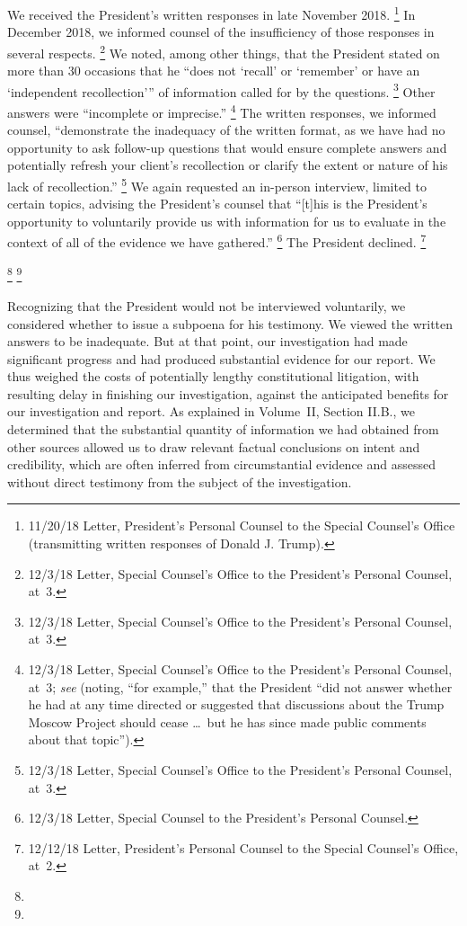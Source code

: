 We received the President's written responses in late November 2018.%
\footnote{11/20/18 Letter, President's Personal Counsel to the Special Counsel's Office (transmitting written responses of Donald J. Trump).}
In December 2018, we informed counsel of the insufficiency of those responses in several respects.%
\footnote{12/3/18 Letter, Special Counsel's Office to the President's Personal Counsel, at~3.}
We noted, among other things, that the President stated on more than 30 occasions that he ``does not `recall' or `remember' or have an `independent recollection'{}'' of information called for by the questions.%
\footnote{12/3/18 Letter, Special Counsel's Office to the President's Personal Counsel, at~3.}
Other answers were ``incomplete or imprecise.''%
\footnote{12/3/18 Letter, Special Counsel's Office to the President's Personal Counsel, at~3;
\textit{see} (noting, ``for example,'' that the President ``did not answer whether he had at any time directed or suggested that discussions about the Trump Moscow Project should cease \dots\ but he has since made public comments about that topic'').}
The written responses, we informed counsel, ``demonstrate the inadequacy of the written format, as we have had no opportunity to ask follow-up questions that would ensure complete answers and potentially refresh your client's recollection or clarify the extent or nature of his lack of recollection.''%
\footnote{12/3/18 Letter, Special Counsel's Office to the President's Personal Counsel, at~3.}
We again requested an in-person interview, limited to certain topics, advising the President's counsel that ``[t]his is the President's opportunity to voluntarily provide us with information for us to evaluate in the context of all of the evidence we have gathered.''%
\footnote{12/3/18 Letter, Special Counsel to the President's Personal Counsel.}
The President declined.%
\footnote{12/12/18 Letter, President's Personal Counsel to the Special Counsel's Office, at~2.}

\footnote{}
\footnote{}

Recognizing that the President would not be interviewed voluntarily, we considered whether to issue a subpoena for his testimony.
We viewed the written answers to be inadequate.
But at that point, our investigation had made significant progress and had produced substantial evidence for our report.
We thus weighed the costs of potentially lengthy constitutional litigation, with resulting delay in finishing our investigation, against the anticipated benefits for our investigation and report.
As explained in Volume~II, Section II.B., we determined that the substantial quantity of information we had obtained from other sources allowed us to draw relevant factual conclusions on intent and credibility, which are often inferred from circumstantial evidence and assessed without direct testimony from the subject of the investigation.

